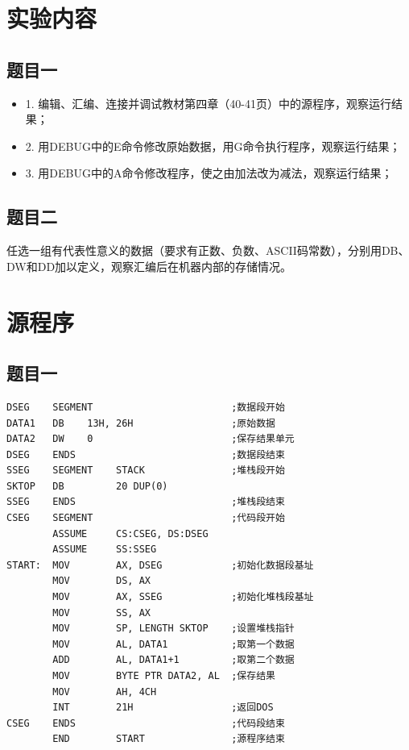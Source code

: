 \documentclass[12pt]{article}
\begin{document}
\section{实验内容}
    \subsection{题目一}
    \begin{itemize}
        \item 1. 编辑、汇编、连接并调试教材第四章（40-41页）中的源程序，观察运行结果；
        \item 2. 用DEBUG中的E命令修改原始数据，用G命令执行程序，观察运行结果；
        \item 3. 用DEBUG中的A命令修改程序，使之由加法改为减法，观察运行结果；
    \end{itemize}

    \subsection{题目二}
    
    任选一组有代表性意义的数据（要求有正数、负数、ASCII码常数），分别用DB、DW和DD加以定义，观察汇编后在机器内部的存储情况。

\section{源程序}
    \subsection{题目一}
    \begin{lstlisting}[caption={汇编源代码 - 题目一}, label=lst:asm2]
DSEG    SEGMENT                        ;数据段开始
DATA1   DB    13H, 26H                 ;原始数据
DATA2   DW    0                        ;保存结果单元
DSEG    ENDS                           ;数据段结束
SSEG    SEGMENT    STACK               ;堆栈段开始
SKTOP   DB         20 DUP(0)
SSEG    ENDS                           ;堆栈段结束
CSEG    SEGMENT                        ;代码段开始
        ASSUME     CS:CSEG, DS:DSEG
        ASSUME     SS:SSEG
START:  MOV        AX, DSEG            ;初始化数据段基址
        MOV        DS, AX
        MOV        AX, SSEG            ;初始化堆栈段基址
        MOV        SS, AX
        MOV        SP, LENGTH SKTOP    ;设置堆栈指针
        MOV        AL, DATA1           ;取第一个数据
        ADD        AL, DATA1+1         ;取第二个数据
        MOV        BYTE PTR DATA2, AL  ;保存结果
        MOV        AH, 4CH
        INT        21H                 ;返回DOS
CSEG    ENDS                           ;代码段结束
        END        START               ;源程序结束
    \end{lstlisting}
\end{document}
